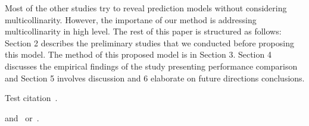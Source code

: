 Most of the other studies try to reveal prediction models without considering multicollinarity. 
However, the importane of our method is addressing multicollinarity in high level.
The rest of this paper is structured as follows:
Section 2 describes the preliminary studies that we conducted before proposing this model.
The method of this proposed model is in Section 3.
Section 4 discusses the empirical findings of the study presenting performance comparison
and Section 5 involves discussion and 6 elaborate on future directions conclusions.





Test citation~\cite{BL12J01}. 
\begin{JournalOnly}
and~\citep{BJL11J01} or~\citet{BJL11J01}.
\end{JournalOnly}







